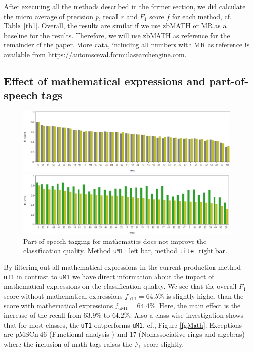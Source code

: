 After executing all the methods described in the former section, we did calculate the micro average of precision $p$, recall $r$ and $F_1$ score $f$ for each method, cf. Table~\ref{tb1}.
Overall, the results are similar if we use zbMATH or MR as a baseline for the results.
Therefore, we will use zbMATH as reference for the remainder of the paper.
More data, including all numbers with MR as reference is available from
\url{https://automsceval.formulasearchengine.com}.

\subsection{Effect of mathematical expressions and part-of-speech tags}
\begin{figure}[ht]
  \centering
  \includegraphics[width=1.1\textwidth]{mathEncoding.png}
  \caption{Mathematical symbols in \texttt{title} and abstract \texttt{text} do not improve the classification quality. Method \texttt{uT1} =left bar; method \texttt{uM1}=right bar%
 }\label{fgMath}
  \includegraphics[width=1.1\textwidth]{POSeffekt.png}
\caption{Part-of-speech tagging for mathematics does not improve the classification quality. Method \texttt{uM1}=left bar, method \texttt{tite}=right bar.}\label{fgPOS}
\end{figure}
By filtering out all mathematical expressions in the current production method \texttt{uT1} in contrast to \texttt{uM1} we have direct information about the impact of mathematical expressions on the classification quality.
We see that the overall $F_1$ score without mathematical expressions $f_\mathrm{uT1}=64.5\%$ is slightly higher than the score with mathematical expressions $f_\mathrm{uM1}=64.4\%.$ 
Here, the main effect is the increase of the recall from  $63.9\%$ to $64.2\%.$
Also a class-wise investigation shows that for most classes, the \texttt{uT1} outperforms \texttt{uM1}, cf., Figure \ref{fgMath}.
Exceptions are pMSCn 46 (Functional analysis ) and 17 (Nonassociative rings and algebras) where the inclusion of math tags raises the $F_1$-score slightly.

